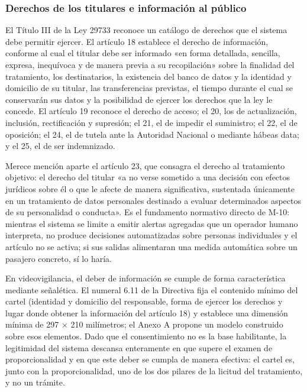 \subsubsection{Derechos de los titulares e información al público}

El Título III de la Ley 29733 reconoce un catálogo de derechos que el
sistema debe permitir ejercer. El artículo 18 establece el derecho de
información, conforme al cual el titular debe ser informado «en forma
detallada, sencilla, expresa, inequívoca y de manera previa a su
recopilación» sobre la finalidad del tratamiento, los destinatarios, la
existencia del banco de datos y la identidad y domicilio de su titular,
las transferencias previstas, el tiempo durante el cual se conservarán
sus datos y la posibilidad de ejercer los derechos que la ley le
concede. El artículo 19 reconoce el derecho de acceso; el 20, los de
actualización, inclusión, rectificación y supresión; el 21, el de
impedir el suministro; el 22, el de oposición; el 24, el de tutela ante
la Autoridad Nacional o mediante hábeas data; y el 25, el de ser
indemnizado.

Merece mención aparte el artículo 23, que consagra el derecho al
tratamiento objetivo: el derecho del titular «a no verse sometido a una
decisión con efectos jurídicos sobre él o que le afecte de manera
significativa, sustentada únicamente en un tratamiento de datos
personales destinado a evaluar determinados aspectos de su personalidad
o conducta». Es el fundamento normativo directo de M-10: mientras el
sistema se limite a emitir alertas agregadas que un operador humano
interpreta, no produce decisiones automatizadas sobre personas
individuales y el artículo no se activa; si sus salidas alimentaran una
medida automática sobre un pasajero concreto, sí lo haría.

En videovigilancia, el deber de información se cumple de forma
característica mediante señalética. El numeral 6.11 de la Directiva fija
el contenido mínimo del cartel (identidad y domicilio del responsable,
forma de ejercer los derechos y lugar donde obtener la información del
artículo 18) y establece una dimensión mínima de 297 × 210 milímetros;
el Anexo A propone un modelo construido sobre esos elementos. Dado que
el consentimiento no es la base habilitante, la legitimidad del sistema
descansa enteramente en que supere el examen de proporcionalidad y en
que este deber se cumpla de manera efectiva: el cartel es, junto con la
proporcionalidad, uno de los dos pilares de la licitud del tratamiento,
y no un trámite.

